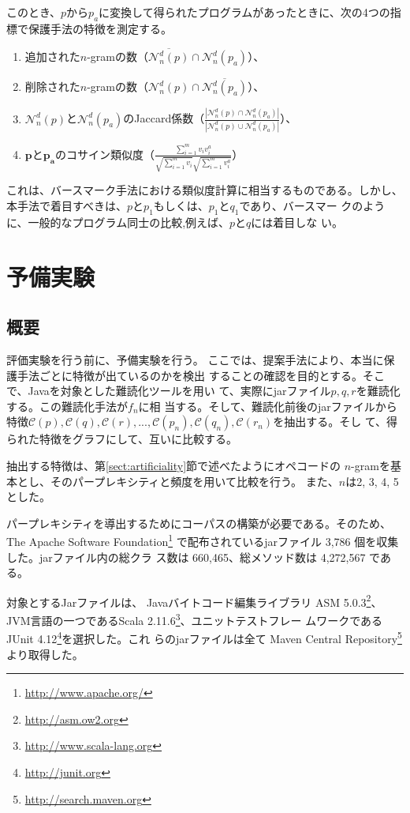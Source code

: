 \documentclass[12pt,twoside]{jreport}
\newcommand{\birth}[1]{\mathcal{C}(#1)}
\newcommand{\distinct}[1]{\mathcal{N}_n^d(#1)}
\begin{document}
このとき、$p$から$p_a$に変換して得られたプログラムがあったときに、次の4つの指標で保護手法の特徴を測定する。
\begin{enumerate}
\item 追加された$n$-gramの数（$\overline{\distinct{p}} \cap \distinct{p_a}$）、
\item 削除された$n$-gramの数（$\distinct{p} \cap \overline{\distinct{p_a}}$）、
\item $\distinct{p}$と$\distinct{p_a}$のJaccard係数（$\displaystyle
  \frac{|\distinct{p} \cap \distinct{p_a}|}{|\distinct{p} \cup
    \distinct{p_a}|}$）、
\item $\bm{p}$と$\bm{p_a}$のコサイン類似度（$\displaystyle
  \frac{\sum_{i=1}^{m} v_i v^a_i}{\sqrt{\sum_{i=1}^m v_i}
    \sqrt{\sum_{i=1}^m v^a_i}}$）
\end{enumerate}

これは、バースマーク手法における類似度計算に相当するものである。しかし、
本手法で着目すべきは、$p$と$p_1$もしくは、$p_1$と$q_1$であり、バースマー
クのように、一般的なプログラム同士の比較,例えば、$p$と$q$には着目しな
い。

\chapter{予備実験}

\section{概要}
評価実験を行う前に、予備実験を行う。
ここでは、提案手法により、本当に保護手法ごとに特徴が出ているのかを検出
することの確認を目的とする。そこで、Javaを対象とした難読化ツールを用い
て、実際にjarファイル$p, q, r$を難読化する。この難読化手法が$f_n$に相
当する。そして、難読化前後のjarファイルから特徴$\birth{p}, \birth{q},
\birth{r}, ..., \birth{p_n}, \birth{q_n}, \birth{r_n}$を抽出する。そし
て、得られた特徴をグラフにして、互いに比較する。

抽出する特徴は、第\ref{sect:artificiality}節で述べたようにオペコードの
$n$-gramを基本とし、そのパープレキシティと頻度を用いて比較を行う。
また、$n$は2, 3, 4, 5とした。

パープレキシティを導出するためにコーパスの構築が必要である。そのため、
The Apache Software Foundation\footnote{\url{http://www.apache.org/}}
で配布されているjarファイル 3,786 個を収集した。jarファイル内の総クラ
ス数は 660,465、総メソッド数は 4,272,567 である。

対象とするJarファイルは、
Javaバイトコード編集ライブラリ ASM
5.0.3\footnote{\url{http://asm.ow2.org}}、JVM言語の一つであるScala
2.11.6\footnote{\url{http://www.scala-lang.org}}、ユニットテストフレー
ムワークである JUnit 4.12\footnote{\url{http://junit.org}}を選択した。これ
らのjarファイルは全て Maven Central
Repository\footnote{\url{http://search.maven.org}} より取得した。
\end{document}
